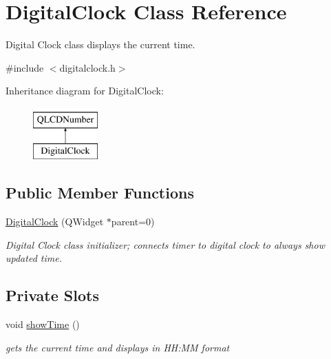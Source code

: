 \hypertarget{class_digital_clock}{}\section{Digital\+Clock Class Reference}
\label{class_digital_clock}


Digital Clock class displays the current time.  




{\ttfamily \#include $<$digitalclock.\+h$>$}

Inheritance diagram for Digital\+Clock\+:\begin{figure}[H]
\begin{center}
\leavevmode
\includegraphics[height=2.000000cm]{class_digital_clock}
\end{center}
\end{figure}
\subsection*{Public Member Functions}
\begin{DoxyCompactItemize}
\item 
\mbox{\hyperlink{class_digital_clock_a1df69f177d5defdd5029ff2e6b7cb564}{Digital\+Clock}} (Q\+Widget $\ast$parent=0)
\begin{DoxyCompactList}\small\item\em Digital Clock class initializer; connects timer to digital clock to always show updated time. \end{DoxyCompactList}\end{DoxyCompactItemize}
\subsection*{Private Slots}
\begin{DoxyCompactItemize}
\item 
void \mbox{\hyperlink{class_digital_clock_a87cd1f935265a947f2ece712bffc4aaa}{show\+Time}} ()
\begin{DoxyCompactList}\small\item\em gets the current time and displays in HH\+:MM format \end{DoxyCompactList}\end{DoxyCompactItemize}


